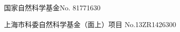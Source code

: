 
\begin{projects}{99}
    \item 国家自然科学基金\quad No. 81771630
    \item 上海市科委自然科学基金（面上）项目\quad{} No.13ZR1426300
\end{projects}
